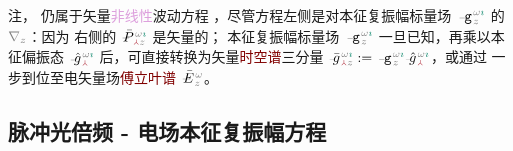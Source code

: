注， 仍属于矢量\textcolor{Plum}{非线性}波动方程 ，尽管方程左侧是对\textcolor{PineGreen}{本征复振幅}标量场 $\Xint{\begin{smallmatrix} ~ \\ {}^{}_{\mathcolor{gray}{-}} \\ ~ \end{smallmatrix}}{09}{\mathtt{g}}^{\;\!\mathcolor{gray}{\omega} \textcolor{PineGreen}{\imath}}_{\;\! \mathcolor{gray}{z}}$ 的 $\mathcolor{gray}{\nabla_z}$：因为 {\one} 右侧的 $\Xint{\mathcolor{gray}{-}}{25}{\bar{P}}^{\;\! \mathcolor{gray}{\omega} \textcolor{PineGreen}{\imath}}_{\;\! \textcolor{Maroon}{\Yup} \mathcolor{gray}{z}}$ 是矢量的；{\two} \textcolor{PineGreen}{本征复振幅}标量场 $\Xint{\begin{smallmatrix} ~ \\ {}^{}_{\mathcolor{gray}{-}} \\ ~ \end{smallmatrix}}{09}{\mathtt{g}}^{\;\!\mathcolor{gray}{\omega} \textcolor{PineGreen}{\imath}}_{\;\! \mathcolor{gray}{z}}$ 一旦已知，再乘以\textcolor{PineGreen}{本征偏振态} $\Xint{{}^{}_{\mathcolor{gray}{-}}}{10}{\hat{g}}^{\;\!\mathcolor{gray}{\omega} \textcolor{PineGreen}{\imath}}_{\;\! \textcolor{Maroon}{\Yup}}$ 后，可直接转换为矢量\textcolor{Maroon}{时空谱}三分量 $\Xint{{}^{}_{\mathcolor{gray}{-}}}{10}{\bar{g}}^{\;\!\mathcolor{gray}{\omega} \textcolor{PineGreen}{\imath}}_{\;\! \textcolor{Maroon}{\Yup} \mathcolor{gray}{z}} := \Xint{\begin{smallmatrix} ~ \\ {}^{}_{\mathcolor{gray}{-}} \\ ~ \end{smallmatrix}}{09}{\mathtt{g}}^{\;\!\mathcolor{gray}{\omega} \textcolor{PineGreen}{\imath}}_{\;\! \mathcolor{gray}{z}} \Xint{{}^{}_{\mathcolor{gray}{-}}}{10}{\hat{g}}^{\;\!\mathcolor{gray}{\omega} \textcolor{PineGreen}{\imath}}_{\;\! \textcolor{Maroon}{\Yup}}$，或通过  一步到位至电矢量场\textcolor{Maroon}{傅立叶谱} $\Xint{\mathcolor{gray}{-}}{25}{\bar{E}}^{\;\!\mathcolor{gray}{\omega}}_{\;\! \mathcolor{gray}{z}}$。

\subsection{脉冲光倍频 - 电场本征复振幅方程}\label{ssec:SHG_spectrum}

